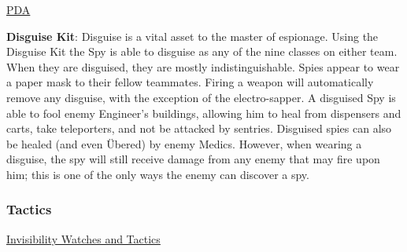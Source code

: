 \begin {center}
\underline {PDA}
\end {center}

{\bf Disguise Kit}: Disguise is a vital asset to the master of espionage.  Using the Disguise Kit the Spy is able to disguise as any of the nine classes on either team. When they are disguised, they are mostly indistinguishable.  Spies appear to wear a paper mask to their fellow teammates. Firing a weapon will automatically remove any disguise, with the exception of the electro-sapper. A disguised Spy is able to fool enemy Engineer's buildings, allowing him to heal from dispensers and carts, take teleporters, and not be attacked by sentries.  Disguised spies can also be healed (and even Übered) by enemy Medics. However, when wearing a disguise, the spy will still receive damage from any enemy that may fire upon him; this is one of the only ways the enemy can discover a spy.

\subsubsection {Tactics} %
\begin {center}
\underline {Invisibility Watches and Tactics}
\end {center}


